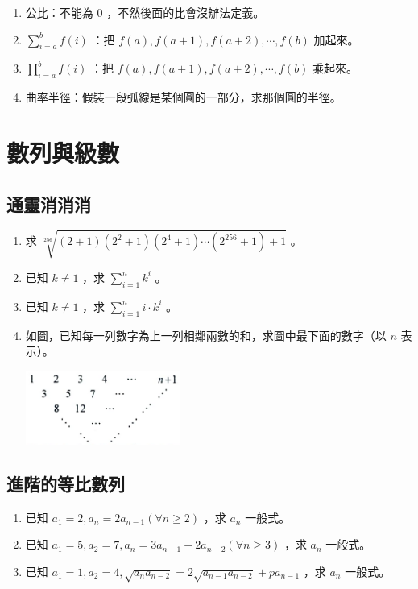 \documentclass[12pt]{article}
\begin{document}
\begin{enumerate}
	\item 公比：不能為 $0$ ，不然後面的比會沒辦法定義。
	\item $\sum _ {i = a} ^ {b} f(i)$ ：把 $f(a), f(a+1), f(a+2), \cdots, f(b)$ 加起來。
	\item $\prod _ {i = a} ^ {b} f(i)$ ：把 $f(a), f(a+1), f(a+2), \cdots, f(b)$ 乘起來。
	\item 曲率半徑：假裝一段弧線是某個圓的一部分，求那個圓的半徑。
\end{enumerate}

\pagebreak

\section{數列與級數}

\subsection{通靈消消消}

\begin{enumerate}
	\item 求 $\sqrt[256]{(2+1)(2^2+1)(2^4+1)\cdots(2^{256}+1)+1}$ 。
		\vspace{10mm}
	\item 已知 $k \ne 1$ ，求 $\sum _{i=1} ^ {n} k^i$ 。
		\vspace{10mm}
	\item 已知 $k \ne 1$ ，求 $\sum _{i=1} ^ {n} i \cdot k^i$ 。
		\vspace{30mm}
	\item 如圖，已知每一列數字為上一列相鄰兩數的和，求圖中最下面的數字（以 $n$ 表示）。
		\begin{center} \includegraphics[width=0.4\textwidth]{CS1718.png} \end{center}
		\vspace{10mm}
\end{enumerate}

\subsection{進階的等比數列}

\begin{enumerate}
	\item 已知 $a_1 = 2, a_n = 2a_{n-1} (\forall n \ge 2)$ ，求 $a_n$ 一般式。
		\vspace{10mm}
	\item 已知 $a_1 = 5, a_2 = 7, a_n = 3a_{n-1} - 2a_{n-2} (\forall n \ge 3)$ ，求 $a_n$ 一般式。
		\vspace{30mm}
	\item 已知 $a_1 = 1, a_2 = 4, \sqrt{a_n a_{n-2}} = 2\sqrt{a_{n-1}a_{n-2}} + p a_{n-1}$ ，求 $a_n$ 一般式。
		\vspace{30mm}
\end{enumerate}
\end{document}
